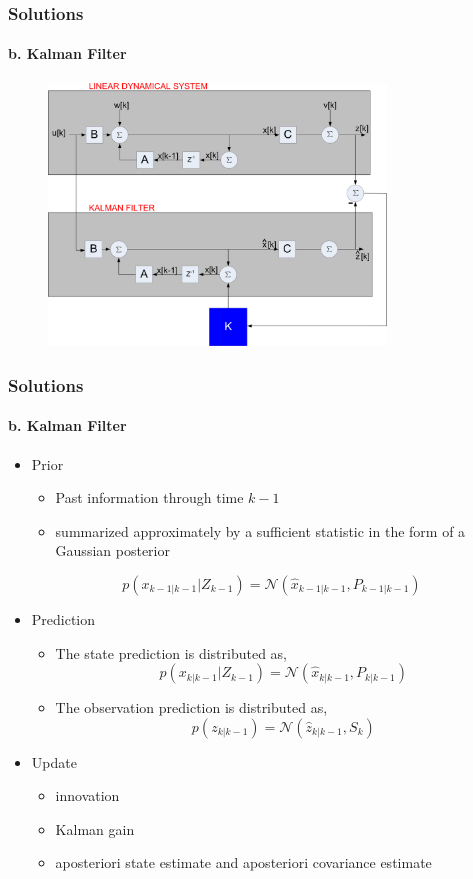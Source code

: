 \begin{frame}
\frametitle{Solutions}
\framesubtitle{b. Kalman Filter}
\mypagenum
\begin{figure}
\includegraphics[width=0.8\textwidth]{figs/TRK_KalmanFilter_blockDiagram.pdf}
\end{figure}
\end{frame}




\begin{frame}
\frametitle{Solutions}
\framesubtitle{b. Kalman Filter}
\mypagenum
\begin{itemize}
\item {\color{red}Prior}
\begin{itemize}
\item Past information through time $k-1$
\item summarized approximately by a sufficient statistic in the form of a Gaussian posterior
\end{itemize}
\begin{equation*}
p(x_{k-1|k-1}|Z_{k-1})=\mathcal{N}  (\hat{x}_{k-1|k-1}, P_{k-1|k-1})
\end{equation*}
\item {\color{red}Prediction}
\begin{itemize}  
\item The state prediction is distributed as,
\begin{equation*}
p(x_{k|k-1}|Z_{k-1})=\mathcal{N}  (\hat{x}_{k|k-1}, P_{k|k-1})
\end{equation*}
\item The observation prediction is distributed as,
\begin{equation*}
p(z_{k|k-1})=\mathcal{N}  (\hat{z}_{k|k-1}, S_k)
\end{equation*}
\end{itemize}
\item {\color{red}Update}
\begin{itemize} 
\item innovation
\item Kalman gain
\item aposteriori state estimate and aposteriori covariance estimate
\end{itemize}
\end{itemize}
\end{frame}



